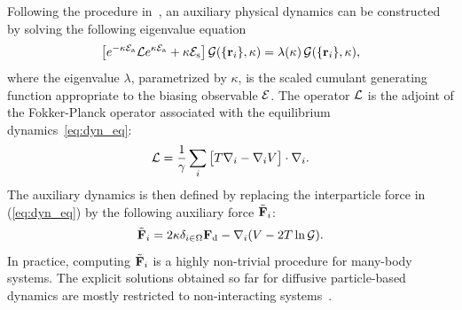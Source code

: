 \documentclass[superscriptaddress, twocolumn, prx, longbibliography, nofootinbib]{revtex4-1}
\newcommand{\tn}[1]{{\color{red}#1}}
\begin{document}
Following the procedure in~\cite{Jack2010,Chetrite2013}, an auxiliary physical dynamics %
can be constructed by solving the following eigenvalue equation 
\tn{
\begin{equation}\label{eq:adjointbiased}
	\big[e^{-\kappa {\cal E}_{\rm a}}{\cal L}e^{\kappa {\cal E}_{\rm a}}+ \kappa{\cal E}_{\rm s}\big]\,{\cal G}(\{{\bf r}_i\},\kappa) = \lambda(\kappa)\,{\cal G}(\{{\bf r}_i\},\kappa) ,
\end{equation}}
where the eigenvalue $\lambda$, parametrized by $\kappa$, is the scaled cumulant generating function appropriate to the biasing observable $\cal E$. 
The operator ${\cal L}$ is the adjoint of the Fokker-Planck operator associated with the equilibrium dynamics~\eqref{eq:dyn_eq}:
\begin{equation}\label{eq:L}
	{\cal L} = \frac{1}{\gamma} \sum_i\big[ T \nabla_i - \nabla_i V\big] \cdot\nabla_i .
\end{equation}
The auxiliary dynamics is then defined by replacing the interparticle force in (\ref{eq:dyn_eq}) by the following auxiliary force $\tilde{\bf F}_i$:
\tn{
\begin{equation} \label{eq:auxiliary}
	\tilde{\bf F}_i = 2 \kappa \delta_{i\in \Omega}{\bf F}_{\rm d} - \nabla_i (V - 2 T \ln{\cal G}) .
\end{equation}
}
In practice, computing $\tilde{\bf F}_i$ is a highly non-trivial procedure for many-body systems. The explicit solutions obtained so far for diffusive particle-based dynamics are mostly restricted to non-interacting systems~\cite{Chetrite2013, Touchette2016}.
\end{document}

